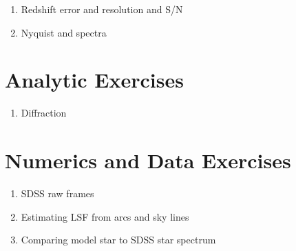 \begin{enumerate} 
\item Redshift error and resolution and S/N
\item Nyquist and spectra
\end{enumerate} 

\section{Analytic Exercises}

\begin{enumerate}
\item Diffraction
\end{enumerate}

\section{Numerics and Data Exercises}

\begin{enumerate}
\item SDSS raw frames
\item Estimating LSF from arcs and sky lines
\item Comparing model star to SDSS star spectrum
\end{enumerate}


  
